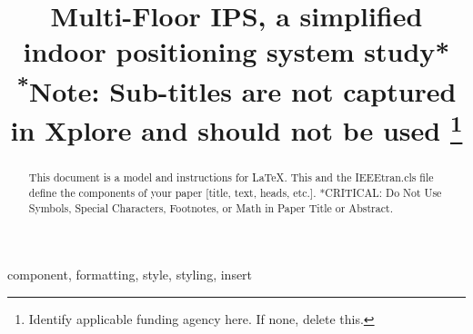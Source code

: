 \documentclass[conference]{IEEEtran}
\begin{document}
	
	\title{Multi-Floor IPS, a simplified indoor positioning system study*\\
		{\footnotesize \textsuperscript{*}Note: Sub-titles are not captured in Xplore and
			should not be used}
		\thanks{Identify applicable funding agency here. If none, delete this.}
	}
	
	\author{
		\and
		\and
	}
	
	\maketitle
	
	\begin{abstract}
		This document is a model and instructions for \LaTeX.
		This and the IEEEtran.cls file define the components of your paper [title, text, heads, etc.]. *CRITICAL: Do Not Use Symbols, Special Characters, Footnotes, 
		or Math in Paper Title or Abstract.
	\end{abstract}
	
	\begin{IEEEkeywords}
		component, formatting, style, styling, insert
	\end{IEEEkeywords}
	
\end{document}
